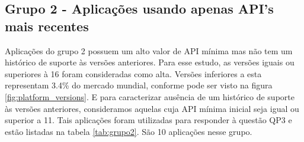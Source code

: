 \subsection{Grupo 2 - Aplicações usando apenas API's mais recentes}
Aplicações do grupo 2 possuem um alto valor de API mínima mas não tem um histórico de suporte
às versões anteriores. Para esse estudo, as versões iguais ou superiores à 16 foram consideradas
como alta. Versões inferiores a esta representam 3.4\% do mercado mundial, conforme pode ser visto
na figura \ref{fig:platform_versions}. E para caracterizar ausência de um histórico de suporte
às versões anteriores,
consideramos aquelas cuja API mínima inicial seja igual ou superior a 11. Tais aplicações foram
utilizadas para responder à questão QP3 e estão listadas na tabela \ref{tab:grupo2}. São 10
aplicações nesse grupo.

